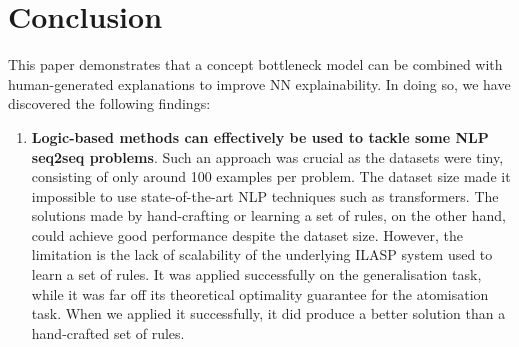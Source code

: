 
\chapter{Conclusion}

This paper demonstrates that a concept bottleneck model can be combined with human-generated explanations to improve NN explainability.
In doing so, we have discovered the following findings:
\begin{enumerate}
    \item \textbf{Logic-based methods can effectively be used to tackle some NLP seq2seq problems}.
    Such an approach was crucial as the datasets were tiny, consisting of only around 100 examples per problem.
    The dataset size made it impossible to use state-of-the-art NLP techniques such as transformers.
    The solutions made by hand-crafting or learning a set of rules, on the other hand, could achieve good performance despite the dataset size.
    However, the limitation is the lack of scalability of the underlying ILASP \cite{RefWorks:RefID:54-ilasp} system used to learn a set of rules.
    It was applied successfully on the generalisation task, while it was far off its theoretical optimality guarantee for the atomisation task.
    When we applied it successfully, it did produce a better solution than a hand-crafted set of rules.
    

\end{enumerate}
